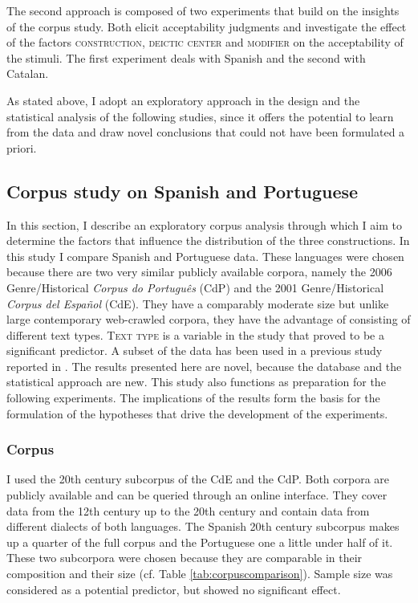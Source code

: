 The second approach is composed of two experiments that build on the insights of the corpus study. Both elicit acceptability judgments and investigate the effect of the factors \textsc{construction}, \textsc{deictic center} and \textsc{modifier} on   the acceptability of the stimuli.  The first experiment deals with Spanish and the second  with Catalan.

As stated above, I adopt an exploratory approach in the design and the statistical analysis of the following studies, since it offers the potential to learn from the data and draw novel conclusions that could not have been formulated a priori.  
\subsection{Corpus study on Spanish and Portuguese}\label{sec:corpussppt}
In this section, I describe an exploratory corpus analysis through which I aim to determine the factors that influence the distribution of the three constructions. In this study I compare Spanish and Portuguese data. These languages were chosen because there are two very  similar publicly available corpora, namely the 2006 Genre/Historical \textit{Corpus do Português} (CdP) and the 2001 Genre/Historical \textit{Corpus del Espa\~{n}ol} (CdE). They have a comparably moderate size but unlike large contemporary web-crawled corpora, they have the advantage of consisting of different text types. \textsc{Text type} is a variable in the study that proved to be a significant predictor. A subset of the data has been used in a previous study reported in \citet{Kocher2018}. The results presented here are   novel, because  the database and the statistical approach are new. This study also functions as preparation for the following experiments. The implications of the results form the basis for the formulation of the hypotheses that drive the development of the experiments. 


\subsubsection{Corpus}
I used the 20th century subcorpus of the CdE and the CdP. Both corpora are publicly available and can be queried through an online interface. They cover data from the 12th century up to the 20th century and contain data from different dialects of both languages. The Spanish 20th century subcorpus makes up a quarter of the full corpus and the Portuguese one a little under half of it. These two subcorpora were chosen because they are comparable in their composition and their size (cf. Table \ref{tab:corpuscomparison}). Sample size was considered as a potential predictor, but showed no significant effect.

